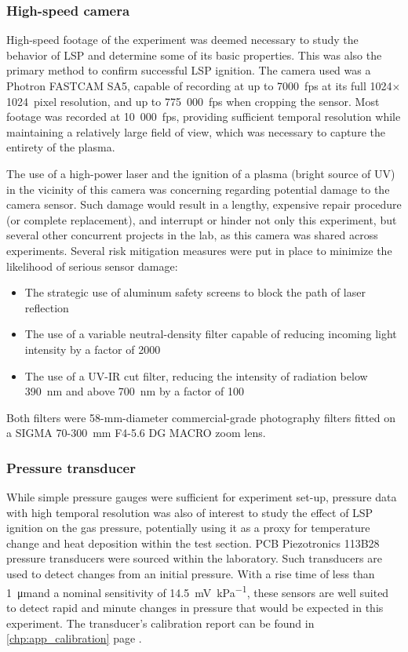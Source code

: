             \subsubsection*{High-speed camera}
                High-speed footage of the experiment was deemed necessary to study the behavior of LSP and determine some of its basic properties. This was also the primary method to confirm successful LSP ignition. The camera used was a Photron FASTCAM SA5, capable of recording at up to 7000~fps at its full 1024$\times$1024~pixel resolution, and up to 775~000~fps when cropping the sensor. Most footage was recorded at 10~000~fps, providing sufficient temporal resolution while maintaining a relatively large field of view, which was necessary to capture the entirety of the plasma.

                The use of a high-power laser and the ignition of a plasma (bright source of UV) in the vicinity of this camera was concerning regarding potential damage to the camera sensor. Such damage would result in a lengthy, expensive repair procedure (or complete replacement), and interrupt or hinder not only this experiment, but several other concurrent projects in the lab, as this camera was shared across experiments. Several risk mitigation measures were put in place to minimize the likelihood of serious sensor damage:
                \begin{itemize}
                    \item The strategic use of aluminum safety screens to block the path of laser reflection
                    \item The use of a variable neutral-density filter capable of reducing incoming light intensity by a factor of 2000
                    \item The use of a UV-IR cut filter, reducing the intensity of radiation below 390~nm and above 700~nm by a factor of 100
                \end{itemize}
                Both filters were 58-mm-diameter commercial-grade photography filters fitted on a SIGMA 70-300~mm F4-5.6 DG MACRO zoom lens. 

                

            \subsubsection*{Pressure transducer} \label{sec:design_pressuresensor}
                While simple pressure gauges were sufficient for experiment set-up, pressure data with high temporal resolution was also of interest to study the effect of LSP ignition on the gas pressure, potentially using it as a proxy for temperature change and heat deposition within the test section. PCB Piezotronics 113B28 pressure transducers were sourced within the laboratory. Such transducers are used to detect changes from an initial pressure. With a rise time of less than \qty{1}{\um}and a nominal sensitivity of \qty{14.5}{mV\per kPa}, these sensors are well suited to detect rapid and minute changes in pressure that would be expected in this experiment. The transducer's calibration report can be found in \autoref{chp:app_calibration} page \pageref*{ds:pcbPressure}.


